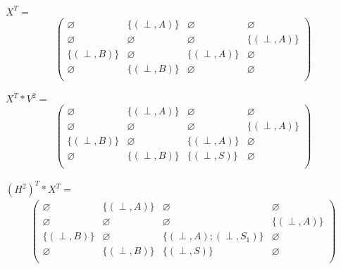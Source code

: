 $X^T=$
\begin{align*}
\begin{pmatrix}
      \varnothing            & \{ (\perp,A) \}        & \varnothing            & \varnothing            \\
      \varnothing            & \varnothing            & \varnothing                & \{ (\perp,A) \}            \\
      \{ (\perp,B) \}        & \varnothing            & \{ (\perp,A) \}            & \varnothing      \\
      \varnothing            & \{ (\perp,B) \}            & \varnothing      & \varnothing  \\
\end{pmatrix}
\end{align*}



$X^T*V^2=$
\begin{align*}
\begin{pmatrix}
      \varnothing            & \{ (\perp,A) \}            & \varnothing            & \varnothing            \\
      \varnothing            & \varnothing            & \varnothing                & \{ (\perp,A) \}            \\
      \{ (\perp,B) \}            & \varnothing            & \{ (\perp,A) \}            & \varnothing      \\
      \varnothing            & \{ (\perp,B) \}            & \{ (\perp,S) \}      & \varnothing  \\
\end{pmatrix}
\end{align*}

$(H^2)^T * X^T =$
\begin{align*}
\begin{pmatrix}
      \varnothing            & \{ (\perp,A) \}            & \varnothing            & \varnothing            \\
      \varnothing        & \varnothing            & \varnothing                & \{ (\perp,A) \}            \\
      \{ (\perp,B) \}            & \varnothing            & \{ (\perp,A);(\perp,S_1) \}            & \varnothing      \\
      \varnothing            & \{ (\perp,B) \}            & \{ (\perp,S) \}      & \varnothing  \\
\end{pmatrix}
\end{align*}


